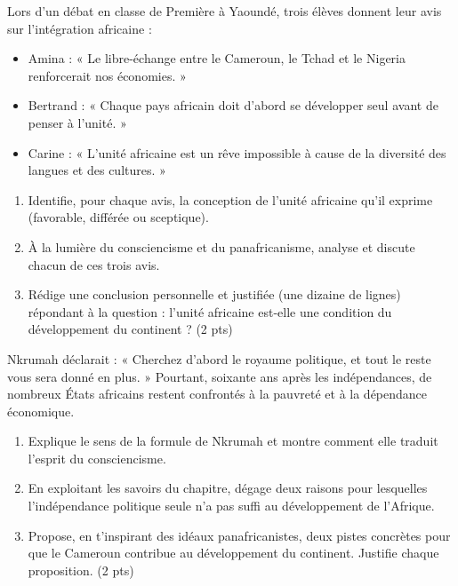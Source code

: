 \documentclass[11pt]{article}
\begin{document}
\begin{exercice}
Lors d'un débat en classe de Première à Yaoundé, trois élèves donnent leur avis sur l'intégration africaine :
\begin{itemize}
\item Amina : « Le libre-échange entre le Cameroun, le Tchad et le Nigeria renforcerait nos économies. »
\item Bertrand : « Chaque pays africain doit d'abord se développer seul avant de penser à l'unité. »
\item Carine : « L'unité africaine est un rêve impossible à cause de la diversité des langues et des cultures. »
\end{itemize}
\begin{enumerate}
\item Identifie, pour chaque avis, la conception de l'unité africaine qu'il exprime (favorable, différée ou sceptique).
\item À la lumière du consciencisme et du panafricanisme, analyse et discute chacun de ces trois avis.
\item Rédige une conclusion personnelle et justifiée (une dizaine de lignes) répondant à la question : l'unité africaine est-elle une condition du développement du continent ? (2 pts)
\end{enumerate}
\end{exercice}

\begin{exercice}
Nkrumah déclarait : « Cherchez d'abord le royaume politique, et tout le reste vous sera donné en plus. » Pourtant, soixante ans après les indépendances, de nombreux États africains restent confrontés à la pauvreté et à la dépendance économique.
\begin{enumerate}
\item Explique le sens de la formule de Nkrumah et montre comment elle traduit l'esprit du consciencisme.
\item En exploitant les savoirs du chapitre, dégage deux raisons pour lesquelles l'indépendance politique seule n'a pas suffi au développement de l'Afrique.
\item Propose, en t'inspirant des idéaux panafricanistes, deux pistes concrètes pour que le Cameroun contribue au développement du continent. Justifie chaque proposition. (2 pts)
\end{enumerate}
\end{exercice}
\end{document}
